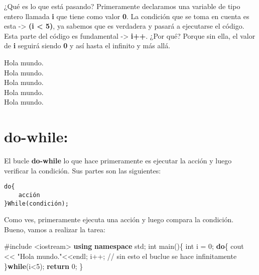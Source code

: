 \documentclass[
  11pt,
  a4paper,
  DIV=11,
  numbers=noendperiod]{scrreprt}
\newenvironment{Shaded}{\begin{snugshade}}{\end{snugshade}}
\newcommand{\CommentTok}[1]{\textcolor[rgb]{0.37,0.37,0.37}{#1}}
\newcommand{\ControlFlowTok}[1]{\textcolor[rgb]{0.00,0.23,0.31}{\textbf{#1}}}
\newcommand{\DataTypeTok}[1]{\textcolor[rgb]{0.68,0.00,0.00}{#1}}
\newcommand{\DecValTok}[1]{\textcolor[rgb]{0.68,0.00,0.00}{#1}}
\newcommand{\ImportTok}[1]{\textcolor[rgb]{0.00,0.46,0.62}{#1}}
\newcommand{\KeywordTok}[1]{\textcolor[rgb]{0.00,0.23,0.31}{\textbf{#1}}}
\newcommand{\NormalTok}[1]{\textcolor[rgb]{0.00,0.23,0.31}{#1}}
\newcommand{\OperatorTok}[1]{\textcolor[rgb]{0.37,0.37,0.37}{#1}}
\newcommand{\PreprocessorTok}[1]{\textcolor[rgb]{0.68,0.00,0.00}{#1}}
\newcommand{\StringTok}[1]{\textcolor[rgb]{0.13,0.47,0.30}{#1}}
\begin{document}
¿Qué es lo que está pasando? Primeramente declaramos una variable de
tipo entero llamada \textbf{i} que tiene como valor \textbf{0}. La
condición que se toma en cuenta es esta -\textgreater{} \textbf{(i
\textless{} 5)}, ya sabemos que es verdadera y pasará a ejecutarse el
código. Esta parte del código es fundamental -\textgreater{}
\textbf{i++}. ¿Por qué? Porque sin ella, el valor de \textbf{i} seguirá
siendo \textbf{0} y así hasta el infinito y más allá.

\begin{tcolorbox}[custombox]
Hola mundo. \\
Hola mundo. \\
Hola mundo. \\
Hola mundo. \\
Hola mundo.
\end{tcolorbox}

\section{do-while:}\label{do-while}

El bucle \textbf{do-while} lo que hace primeramente es ejecutar la
acción y luego verificar la condición. Sus partes son las siguientes:

\begin{tcolorbox}[custombox]
\begin{verbatim}
do{ 
    acción 
}While(condición);
\end{verbatim}
\end{tcolorbox}

Como ves, primeramente ejecuta una acción y luego compara la condición.
Bueno, vamos a realizar la tarea:

\begin{Shaded}
\begin{Highlighting}[]
\PreprocessorTok{\#include }\ImportTok{\textless{}iostream\textgreater{}}
\KeywordTok{using} \KeywordTok{namespace}\NormalTok{ std}\OperatorTok{;}
\DataTypeTok{int}\NormalTok{ main}\OperatorTok{()\{}
    \DataTypeTok{int}\NormalTok{ i }\OperatorTok{=} \DecValTok{0}\OperatorTok{;}
    \ControlFlowTok{do}\OperatorTok{\{}
\NormalTok{        cout }\OperatorTok{\textless{}\textless{}} \StringTok{"Hola mundo."}\OperatorTok{\textless{}\textless{}}\NormalTok{endl}\OperatorTok{;}
\NormalTok{        i}\OperatorTok{++;} \CommentTok{// sin esto el buclue se hace infinitamente}
    \OperatorTok{\}}\ControlFlowTok{while}\OperatorTok{(}\NormalTok{i}\OperatorTok{\textless{}}\DecValTok{5}\OperatorTok{);}
    \ControlFlowTok{return} \DecValTok{0}\OperatorTok{;}
\OperatorTok{\}}
\end{Highlighting}
\end{Shaded}
\end{document}

